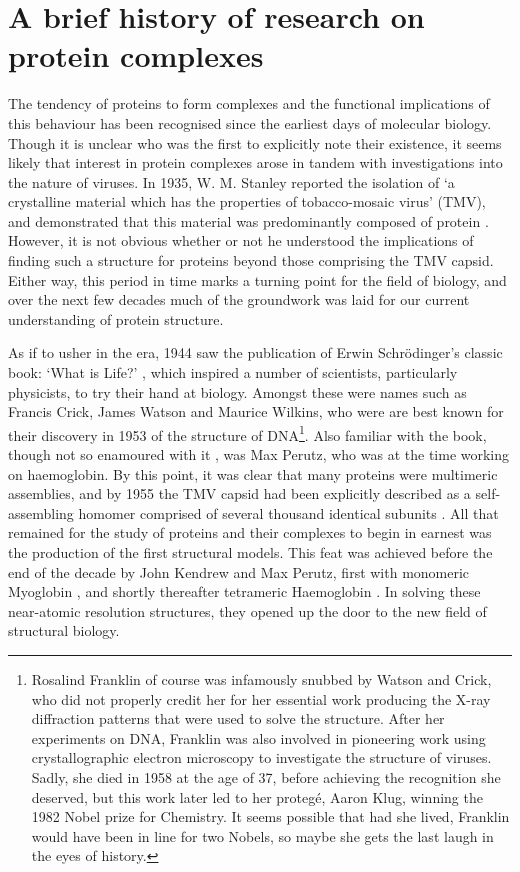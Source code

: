 \documentclass[a4paper,11pt,twoside,openright]{scrbook}
\begin{document}
\section{A brief history of research on protein complexes}
The tendency of proteins to form complexes and the functional implications of this behaviour has been recognised since the earliest days of molecular biology. Though it is unclear who was the first to explicitly note their existence, it seems likely that interest in protein complexes arose in tandem with investigations into the nature of viruses. In 1935, W. M. Stanley reported the isolation of `a crystalline material which has the properties of tobacco-mosaic virus' (TMV), and demonstrated that this material was predominantly composed of protein \cite{Stanley1935}. However, it is not obvious whether or not he understood the implications of finding such a structure for proteins beyond those comprising the TMV capsid. Either way, this period in time marks a turning point for the field of biology, and over the next few decades much of the groundwork was laid for our current understanding of protein structure.

As if to usher in the era, 1944 saw the publication of Erwin Schrödinger's classic book: `What is Life?' \cite{Schrodinger1947}, which inspired a number of scientists, particularly physicists, to try their hand at biology. Amongst these were names such as Francis Crick, James Watson and Maurice Wilkins, who were are best known for their discovery in 1953 of the structure of DNA\footnote{Rosalind Franklin of course was infamously snubbed by Watson and Crick, who did not properly credit her for her essential work producing the X-ray diffraction patterns that were used to solve the structure. After her experiments on DNA, Franklin was also involved in pioneering work using crystallographic electron microscopy to investigate the structure of viruses. Sadly, she died in 1958 at the age of 37, before achieving the recognition she deserved, but this work later led to her proteg{\'e},  Aaron Klug, winning the 1982 Nobel prize for Chemistry. It seems possible that had she lived, Franklin would have been in line for two Nobels, so maybe she gets the last laugh in the eyes of history.}. Also familiar with the book, though not so enamoured with it \cite{Dronamraju1999}, was Max Perutz, who was at the time working on haemoglobin. By this point, it was clear that many proteins were multimeric assemblies, and by 1955 the TMV capsid had been explicitly described as a self-assembling homomer comprised of several thousand identical subunits \cite{Fraenkel-Conrat1955}. All that remained for the study of proteins and their complexes to begin in earnest was the production of the first structural models. This feat was achieved before the end of the decade by John Kendrew and Max Perutz, first with monomeric Myoglobin \cite{Kendrew1958}, and shortly thereafter tetrameric Haemoglobin \cite{Perutz1960}. In solving these near-atomic resolution structures, they opened up the door to the new field of structural biology.
\end{document}
